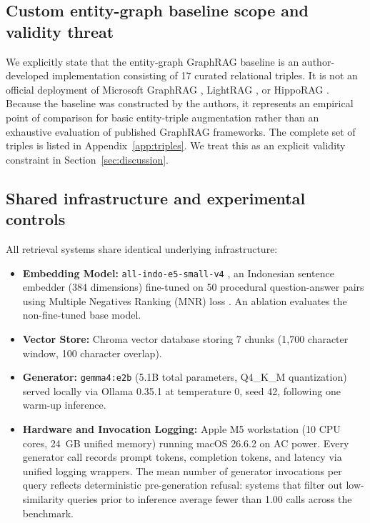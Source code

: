 \documentclass[preprint,10pt]{elsarticle}
\begin{document}
\subsection{Custom entity-graph baseline scope and validity threat}
We explicitly state that the entity-graph GraphRAG baseline is an author-developed implementation consisting of 17 curated relational triples. It is not an official deployment of Microsoft GraphRAG \cite{edge2024graphrag}, LightRAG \cite{guo2024lightrag}, or HippoRAG \cite{gutierrez2024hipporag}. Because the baseline was constructed by the authors, it represents an empirical point of comparison for basic entity-triple augmentation rather than an exhaustive evaluation of published GraphRAG frameworks. The complete set of triples is listed in Appendix~\ref{app:triples}. We treat this as an explicit validity constraint in Section~\ref{sec:discussion}.

\subsection{Shared infrastructure and experimental controls}
All retrieval systems share identical underlying infrastructure:
\begin{itemize}[leftmargin=*]
\item \textbf{Embedding Model:} \texttt{all-indo-e5-small-v4} \cite{lazarusnlp_e5}, an Indonesian sentence embedder (384 dimensions) fine-tuned on 50 procedural question-answer pairs using Multiple Negatives Ranking (MNR) loss \cite{henderson2017mnr}. An ablation evaluates the non-fine-tuned base model.
\item \textbf{Vector Store:} Chroma vector database storing 7 chunks (1,700 character window, 100 character overlap).
\item \textbf{Generator:} \texttt{gemma4:e2b} (5.1B total parameters, Q4\_K\_M quantization) served locally via Ollama 0.35.1 at temperature 0, seed 42, following one warm-up inference.
\item \textbf{Hardware and Invocation Logging:} Apple M5 workstation (10 CPU cores, 24~GB unified memory) running macOS 26.6.2 on AC power. Every generator call records prompt tokens, completion tokens, and latency via unified logging wrappers. The mean number of generator invocations per query reflects deterministic pre-generation refusal: systems that filter out low-similarity queries prior to inference average fewer than 1.00 calls across the benchmark.
\end{itemize}
\end{document}

